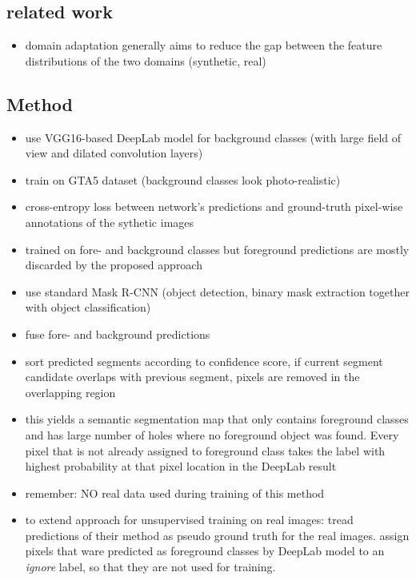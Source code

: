 \subsection{related work}

\begin{itemize}
	\item domain adaptation generally aims to reduce the gap between the feature distributions of the two domains (synthetic, real)
\end{itemize}

\subsection{Method}

\begin{itemize}
	\item use VGG16-based DeepLab model for background classes (with large field of view and dilated convolution layers)
	\item train on GTA5 dataset (background classes look photo-realistic)
	\item cross-entropy loss between network's predictions and ground-truth pixel-wise annotations of the sythetic images
	\item trained on fore- and background classes but foreground predictions are mostly discarded by the proposed approach
	\item use standard Mask R-CNN (object detection, binary mask extraction together with object classification) 
	\item fuse fore- and background predictions
	\item sort predicted segments according to confidence score, if current segment candidate overlaps with previous segment, pixels are removed in the overlapping region
	\item this yields a semantic segmentation map that only contains foreground classes and has large number of holes where no foreground object was found. Every pixel that is not already assigned to foreground class takes the label with highest probability at that pixel location in the DeepLab result
	\item remember: NO real data used during training of this method
	\item to extend approach for unsupervised training on real images: tread predictions of their method as pseudo ground truth for the real images. assign pixels that ware predicted as foreground classes by DeepLab model to an \textit{ignore} label, so that they are not used for training. 
\end{itemize}

